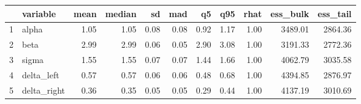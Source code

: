 \begin{table}[ht]
\centering
\begin{tabular}{rlrrrrrrrrr}
  \hline
 & variable & mean & median & sd & mad & q5 & q95 & rhat & ess\_bulk & ess\_tail \\ 
  \hline
1 & alpha & 1.05 & 1.05 & 0.08 & 0.08 & 0.92 & 1.17 & 1.00 & 3489.01 & 2864.36 \\ 
  2 & beta & 2.99 & 2.99 & 0.06 & 0.05 & 2.90 & 3.08 & 1.00 & 3191.33 & 2772.36 \\ 
  3 & sigma & 1.55 & 1.55 & 0.07 & 0.07 & 1.44 & 1.66 & 1.00 & 4062.79 & 3035.58 \\ 
  4 & delta\_left & 0.57 & 0.57 & 0.06 & 0.06 & 0.48 & 0.68 & 1.00 & 4394.85 & 2876.97 \\ 
  5 & delta\_right & 0.36 & 0.35 & 0.05 & 0.05 & 0.29 & 0.44 & 1.00 & 4137.19 & 3010.69 \\ 
   \hline
\end{tabular}
\end{table}
